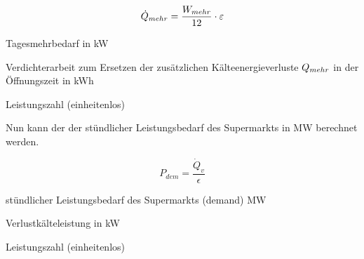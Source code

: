 \begin{equation}
	\pmehr = \frac{\lmehr}{12} \cdot \epsilon
\label{spmehr}
\end{equation}

\begin{description}[\dth]

	\item[$\pmehr$] Tagesmehrbedarf in kW
	\item[$\lmehr$] Verdichterarbeit zum Ersetzen der zus\"atzlichen
	K\"alteenergieverluste $Q_{mehr}$ in der \"Offnungszeit in kWh
	\item[$\epsilon$] Leistungszahl (einheitenlos)

\end{description}
\vspace{0.5cm}

Nun kann der der st\"undlicher Leistungsbedarf des Supermarkts in MW berechnet
werden.

\begin{equation}
	P_{dem} = \frac{\dot Q_v}{\epsilon}
\label{pdem}
\end{equation}
\begin{description}[\dth]

	\item[$P_{dem}$] st\"undlicher Leistungsbedarf des Supermarkts (demand)
	MW
	\item[$\dot Q_v$] Verlustk\"alteleistung in kW
	\item[$\epsilon$] Leistungszahl (einheitenlos)

\end{description}
\vspace{0.5cm}

